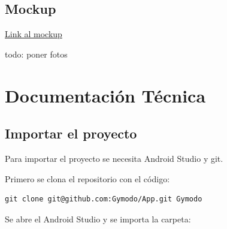 \documentclass[12pt,a4paper]{article}
\begin{document}
\subsection{Mockup}
\href{https://mockittapp.wondershare.com/app/3398ef738f7ac4f35fae5df4eb77004473612d19?simulator_type=device&sticky}{Link al mockup}

todo: poner fotos

\clearpage

\section{Documentación Técnica}

\subsection{Importar el proyecto}

Para importar el proyecto se necesita Android Studio y git.

Primero se clona el repositorio con el código:
\begin{lstlisting}
git clone git@github.com:Gymodo/App.git Gymodo
\end{lstlisting}

Se abre el Android Studio y se importa la carpeta:
\end{document}
